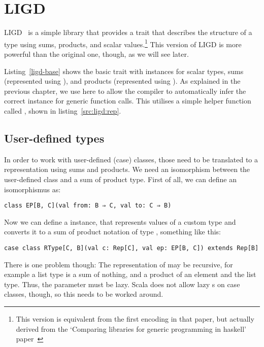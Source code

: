 \section{LIGD}


LIGD~\cite{Cheney:2002:LIG:581690.581698} is a simple library that provides a  trait that describes
the structure of a type using sums, products, and scalar values.\footnote{This
version is equivalent from the first encoding in that paper, but actually
derived from the `Comparing libraries for generic programming in haskell'
paper~\cite{DBLP:conf/haskell/RodriguezJJGKO08}}
This version of LIGD is more powerful than the original one, though, as we
will see later.

Listing~\ref{ligd-base} shows the basic  trait with instances for
scalar types, sums (represented using ), and products (represented
using ). As explained in the previous chapter, we use 
here to allow the compiler to automatically infer the correct 
instance for generic function calls. This  utilises a simple helper function called ,
shown in listing~\ref{src:ligd:rep}.


\subsection{User-defined types}
In order to work with user-defined (case) classes, those need to be
translated to a representation using sums and products. We need an
isomorphism between the user-defined class and a sum of product type. First
of all, we can define an isomorphismus as:
\begin{lstlisting}[gobble=2]
  class EP[B, C](val from: B ⇒ C, val to: C ⇒ B)
\end{lstlisting}
Now we can define a  instance, that represents values of a custom
type  and converts it to a sum of product notation of type ,
something like this:
\begin{lstlisting}[gobble=2]
  case class RType[C, B](val c: Rep[C], val ep: EP[B, C]) extends Rep[B]
\end{lstlisting}
There is one problem though: The representation of  may be recursive,
for example a list type is a sum of nothing, and a product of an element and
the list type. Thus, the parameter  must be lazy. Scala does not allow
lazy s on case classes, though, so this needs to be worked around.

